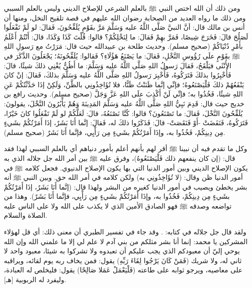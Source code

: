 ومن ذلك أن الله اختص النبي ﷺ بالعلم الشرعي للإصلاح الديني وليس بالعلم السببي ومن ذلك ما رواه العديد من الصحابة رضوان الله عليهم في قصة تلقيح النخل، ومنها أن أنس بن مالك قال: أنَّ النبيَّ صَلَّى اللَّهُ عليه وَسَلَّمَ مَرَّ بقَوْمٍ يُلَقِّحُونَ، فَقالَ: لو لَمْ تَفْعَلُوا لَصَلُحَ قالَ: فَخَرَجَ شِيصًا، فَمَرَّ بهِمْ فَقالَ: ما لِنَخْلِكُمْ؟ قالوا: قُلْتَ كَذَا وَكَذَا، قالَ: أَنْتُمْ أَعْلَمُ بأَمْرِ دُنْيَاكُمْ {\footnotesize (صحيح مسلم)}. 
وحديث طلحة بن عبيدالله حيث قال: مَرَرْتُ مع رَسولِ اللهِ ﷺ بقَوْمٍ علَى رُؤُوسِ النَّخْلِ، فَقالَ: ما يَصْنَعُ هَؤُلَاءِ؟ فَقالوا: يُلَقِّحُونَهُ؛ يَجْعَلُونَ الذَّكَرَ في الأُنْثَى فيَلْقَحُ، فَقالَ رَسولُ اللهِ صَلَّى اللَّهُ عليه وَسَلَّمَ: ما أَظُنُّ يُغْنِي ذلكَ شيئًا، قالَ: فَأُخْبِرُوا بذلكَ فَتَرَكُوهُ، فَأُخْبِرَ رَسولُ اللهِ صَلَّى اللَّهُ عليه وَسَلَّمَ بذلكَ، فَقالَ: إنْ كانَ يَنْفَعُهُمْ ذلكَ فَلْيَصْنَعُوهُ؛ فإنِّي إنَّما ظَنَنْتُ ظَنًّا، فلا تُؤَاخِذُونِي بالظَّنِّ، وَلَكِنْ إذَا حَدَّثْتُكُمْ عَنِ اللهِ شيئًا، فَخُذُوا به؛ فإنِّي لَنْ أَكْذِبَ علَى اللهِ عَزَّ وَجَلَّ {\footnotesize (صحيح مسلم)}. وحديث رافع بن خديج حيث قال: قَدِمَ نَبِيُّ اللهِ صَلَّى اللَّهُ عليه وَسَلَّمَ المَدِينَةَ وَهُمْ يَأْبُرُونَ النَّخْلَ، يقولونَ: يُلَقِّحُونَ النَّخْلَ، فَقالَ: ما تَصْنَعُونَ؟ قالوا: كُنَّا نَصْنَعُهُ، قالَ: لَعَلَّكُمْ لو لَمْ تَفْعَلُوا كانَ خَيْرًا، فَتَرَكُوهُ، فَنَفَضَتْ -أَوْ فَنَقَصَتْ- قالَ: فَذَكَرُوا ذلكَ له، فَقالَ: إنَّما أَنَا بَشَرٌ، إذَا أَمَرْتُكُمْ بشَيءٍ مِن دِينِكُمْ، فَخُذُوا به، وإذَا أَمَرْتُكُمْ بشَيءٍ مِن رَأْيِي، فإنَّما أَنَا بَشَرٌ {\footnotesize (صحيح مسلم)}. 

وكل ما تقدم فيه أن نبينا ﷺ أقر لهم بأنهم أعلم بأمور دنياهم أي بالعلم السببي لهذا فقد قال: (إن كان ينفعهم ذلك فَلْيَصْنَعُوهُ)، وفرق عليه ﷺ بين أمر الله جل جلاله الذي به يكون الإصلاح الديني وبين أمور الدنيا التي بها يكون الإصلاح الدنيوي. فجعل كلامه ﷺ في أمور الدنيا ظن وقال: (لا تُؤَاخِذُونِي به) ولكن كلامه في أمر الله حق. وبين النبي ﷺ أنه بشر يخطئ ويصيب في أمور الدنيا كغيره من البشر ولهذا قال:  (إنَّما أَنَا بَشَرٌ، إذَا أَمَرْتُكُمْ بشَيءٍ مِن دِينِكُمْ، فَخُذُوا به، وإذَا أَمَرْتُكُمْ بشَيءٍ مِن رَأْيِي، فإنَّما أَنَا بَشَرٌ). وهذا من تواضعه وصدقه ﷺ فهو الصادق الأمين الذي لا يكذب على الله ولا على الناس عليه الصلاة والسلام. 

ولقد قال جل جلاله في كتابه: 
\quranayah*[18][110]{\footnotesize \surahname*[18]}. وقد جاء في تفسير الطبري أن معنى ذلك: أي قل لهؤلاء المشركين يا محمد: إنما أنا بشر مثلكم من بني آدم لا علم لي إلا ما علمني الله وإن الله يوحي إليّ أن معبودكم الذي يجب عليكم أن تعبدوه ولا تشركوا به شيئا، معبود واحد لا ثاني له، ولا شريك (فَمَنْ كَانَ يَرْجُوا لِقَاءَ رَبِّهِ) يقول: فمن يخاف ربه يوم لقائه، ويراقبه على معاصيه، ويرجو ثوابه على طاعته (فَلْيَعْمَلْ عَمَلا صَالِحًا) يقول: فليخلص له العبادة، وليفرد له الربوبية [هـ].


